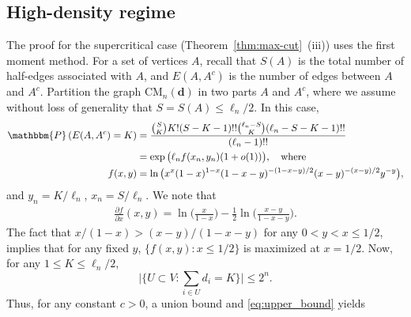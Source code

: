 \documentclass[11pt,a4paper, reqno]{article}
\numberwithin{equation}{section}
\numberwithin{equation}{section}
\newcommand{\prob}[1]{\ensuremath{\mathbbm{P}\left(#1\right)}}
\newcommand{\1}{\ensuremath{\mathbbm{1}}}
\newcommand{\CM}{\ensuremath{\mathrm{CM}_n(\boldsymbol{d})}}
\numberwithin{equation}{section}
\numberwithin{theorem}{section}
\begin{document}
\subsection{High-density regime}\label{ssec:large-mean}
The proof for the supercritical case (Theorem~\ref{thm:max-cut}~(iii)) uses the first moment method. 
For a set of vertices $A$, recall that $S(A)$ is the total number of half-edges associated with $A$, and $E(A,A^c)$ is the number of edges between $A$ and $A^c$. 
Partition the graph $\CM$ in two parts $A$ and $A^c$, where we assume without loss of generality that $S=S(A)\leq \ell_n/2$. %
In this case, 
 \begin{equation}
 \label{eq:upper_bound}
  \begin{split}
  \prob{E(A,A^c)=K}& = \frac{\binom{S }{K}K! (S-K-1)!! \binom{\ell_n-S }{ K}(\ell_n-S-K-1)!!}{(\ell_n-1)!!} \\
  &= \exp\big(\ell_n f(x_n, y_n)  (1+ o(1))\big) , \quad \text{where }\\
 f(x, y)  &= \ln\big(x^{x} (1-x)^{1-x}(1-x-y)^{-(1-x-y)/2}(x-y)^{-(x-y)/2}y^{-y}\big),
  \end{split}
 \end{equation}
 and $y_n = K/ \ell_n$, $x_n = S/ \ell_n$.  
 We note that 
 \begin{align}
 \frac{\partial f}{\partial x} (x,y) = \ln \bigg(\frac{x}{1-x}\bigg) - \frac{1}{2} \ln \bigg(\frac{x-y}{1- x -y}\bigg). \nonumber 
 \end{align}
 The fact that $x/(1-x) > (x-y)/(1-x-y)$ for any $0<y< x \leq 1/2$, implies that for any fixed $y$, $\{f(x,y): x \leq 1/2\}$ is maximized at $x=1/2$. 
Now, for any $1\leq K\leq \ell_n/2$,
 \begin{equation}
  \Big|\Big\{U\subset V: \sum_{i\in U}d_i=K\Big\}\Big|\leq 2^n.
 \end{equation}  
 Thus, for any constant $c>0$, a union bound and \eqref{eq:upper_bound} yields 
\end{document}
